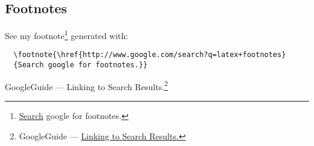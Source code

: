 
\clearpage
\newpage
\subsection{Footnotes}
See my
footnote\footnote{\href{http://www.google.com/search?q=latex+footnotes}{Search}
google for footnotes.}
generated with:

\begin{verbatim}
  \footnote{\href{http://www.google.com/search?q=latex+footnotes}
  {Search google for footnotes.}}
\end{verbatim}

\noindent GoogleGuide --- Linking to Search
Results.\footnote{GoogleGuide --- \href{http://www.googleguide.com/linking.html}{Linking to Search Results.}}



